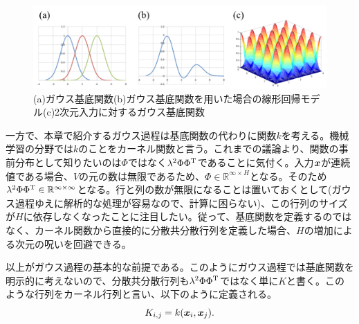 \documentclass[dvipdfmx, 9pt, a4paper]{jsarticle}
\numberwithin{equation}{section}
\newcommand{\bm}[1]{{\mbox{\boldmath $#1$}}}
\begin{document}
\begin{figure}[b]
\begin{center}
\includegraphics[width=15cm]{fig1.png}
\caption{(a)ガウス基底関数(b)ガウス基底関数を用いた場合の線形回帰モデル(c)2次元入力に対するガウス基底関数}
\end{center}
\end{figure}

一方で、本章で紹介するガウス過程は基底関数の代わりに関数$k$を考える。機械学習の分野では$k$のことをカーネル関数と言う。これまでの議論より、関数の事前分布として知りたいのは$\Phi$ではなく$\lambda^2\Phi\Phi^{\rm T}$であることに気付く。入力$\bm x$が連続値である場合、$V$の元の数は無限であるため、$\Phi \in \mathbb{R}^{\infty \times H}$となる。そのため$\lambda^2\Phi\Phi^{\rm T} \in \mathbb{R}^{\infty \times \infty}$となる。行と列の数が無限になることは置いておくとして(ガウス過程ゆえに解析的な処理が容易なので、計算に困らない)、この行列のサイズが$H$に依存しなくなったことに注目したい。従って、基底関数を定義するのではなく、カーネル関数から直接的に分散共分散行列を定義した場合、$H$の増加による次元の呪いを回避できる。\par
以上がガウス過程の基本的な前提である。このようにガウス過程では基底関数を明示的に考えないので、分散共分散行列も$\lambda^2\Phi\Phi^{\rm T}$ではなく単に$K$と書く。このような行列をカーネル行列と言い、以下のように定義される。
\begin{equation}
K_{i, j}=k(\bm x_i, \bm x_j).
\end{equation}
\end{document}
